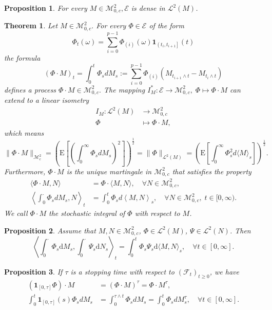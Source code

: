 \documentclass{report}
\newtheorem{proposition}{Proposition}[section]
\newtheorem{theorem}{Theorem}[section]
\theoremstyle{nonumberplain}
\begin{document}
\begin{proposition}
For every $M \in \mathscr{M}^2_{0,c}, \mathscr{E}$ is dense in $\mathscr{L}^{2}(M)$.
\end{proposition}

\begin{theorem}
Let $M \in \mathscr{M}^2_{0,c} .$ For every $\Phi \in \mathscr{E}$ of the form
\[
\Phi_{t}(\omega)=\sum_{i=0}^{p-1} \Phi_{(i)}(\omega) \mathbf{1}_{\left(t_{i}, t_{i+1}\right]}(t)
\]
the formula
\[
(\Phi \cdot M)_{t}=\int_{0}^{t}\Phi_sdM_s:=\sum_{i=0}^{p-1} \Phi_{(i)}\left(M_{t_{i+1} \wedge t}-M_{t_{i} \wedge t}\right)
\]
defines a process $\Phi \cdot M \in \mathscr{M}^2_{0,c}.$ The mapping $I_M^*:\mathscr{E}\to\mathscr{M}^2_{0,c},\;\Phi \mapsto \Phi \cdot M$ can extend to a linear isometry
\begin{align*}
I_M:\mathscr{L}^{2}(M)&\longrightarrow\mathscr{M}^2_{0,c}\\
\Phi &\longmapsto \Phi \cdot M,
\end{align*}
which means
\[
\|\Phi \cdot M\|_{\mathscr{M}^2_c}=\left(\mathrm{E}\left[\left(\int_{0}^{\infty}\Phi_sdM_s\right)^2\right]\right)^{\tfrac{1}{2}}=\|\Phi\|_{\mathscr{L}^2(M)}=\left(\mathrm{E}\left[\int_{0}^{\infty} \Phi_{s}^{2} d\langle M\rangle_{s}\right]\right)^{\tfrac{1}{2}}.
\]
Furthermore, $\Phi \cdot M$ is the unique martingale in $\mathscr{M}^2_{0,c}$ that satisfies the property
\begin{align*}
\langle \Phi \cdot M, N\rangle&= \Phi \cdot\langle M, N\rangle, \quad \forall N \in\mathscr{M}^2_{0,c},\\
\left\langle \int_{0}^{\cdot}\Phi_sdM_s, N\right\rangle_t&= \int_{0}^{t}\Phi_sd\left\langle M, N\right\rangle_s, \quad \forall N \in\mathscr{M}^2_{0,c},\;t\in[0,\infty).
\end{align*}
We call $\Phi \cdot M$ the stochastic integral of $\Phi$ with respect to $M$.
\end{theorem}

\begin{proposition}
	Assume that $M,N\in\mathscr{M}^2_{0,c}$, $\Phi\in\mathscr{L}^2(M)$, $\Psi\in\mathscr{L}^2(N)$. Then
	\[
	\left\langle\int_{0}^\cdot \Phi_{s} \mathrm{d} M_{s}, \int_{0}^\cdot \Psi_{s} \mathrm{d} N_{s}\right\rangle_{t}=\int_{0}^{t} \Phi_{s}\Psi_{s} \mathrm{d}\langle M, N\rangle_{s},\quad\forall t\in[0,\infty].
	\]
\end{proposition}

\begin{proposition}
If $\tau$ is a stopping time with respect to $(\mathcal{F}_t)_{t\ge0}$, we have
\begin{align*}
\left(\mathbf{1}_{[0, \tau]} \Phi\right) \cdot M&=(\Phi \cdot M)^{\tau}=\Phi \cdot M^{\tau},\\
\int_{0}^{t}\mathbf{1}_{[0, \tau]}(s)\Phi_sdM_s&=\int_{0}^{\tau\wedge t}\Phi_sdM_s=\int_{0}^{ t}\Phi_sdM_s^{\tau},\quad\forall t\in[0,\infty].
\end{align*}
\end{proposition}
\end{document}
